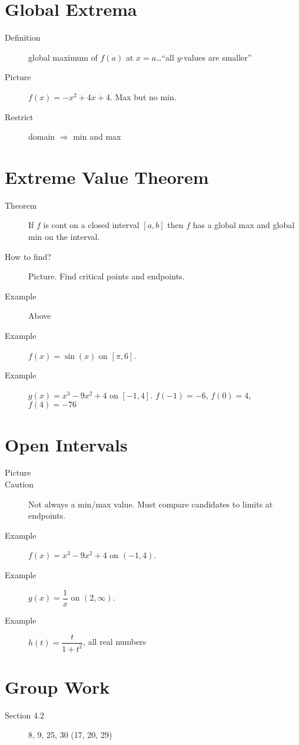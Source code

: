 \documentclass[11pt]{article}
\begin{document}
\drawtitle

\section*{Global Extrema}
\begin{description}
\item[Definition] global maximum of $f(a)$ at $x=a$\dots ``all
  $y$-values are smaller''
\item[Picture] $f(x)=-x^2+4x+4$.  Max but no min.
\item[Restrict] domain $\Rightarrow$ min and max

\end{description}

\section*{Extreme Value Theorem}
\begin{description}
\item[Theorem] If $f$ is cont on a closed interval $[a,b]$ then $f$
  has a global max and global min on the interval.
\item[How to find?] Picture.  Find critical points and endpoints.
\item[Example] Above
\item[Example] $f(x)=\sin(x)$ on $[\pi,6]$.
\item[Example] $g(x)=x^3-9x^2+4$ on $[-1,4]$. $f(-1) = -6$, $f(0) = 4$, $f(4)=-76$
\end{description}

\section*{Open Intervals}
\begin{description}
\item[Picture]
\item[Caution] Not always a min/max value.  Must compare candidates to
  limits at endpoints.
\item[Example] $f(x)=x^3-9x^2+4$ on $(-1,4)$.
\item[Example] $g(x)=\dfrac{1}{x}$ on $(2,\infty)$.
\item[Example] $h(t) = \dfrac{t}{1+t^2}$, all real numbers
\end{description}

\section*{Group Work}
\begin{description}
\item[Section 4.2] 8, 9, 25, 30 (17, 20, 29)
\end{description}
\end{document}
